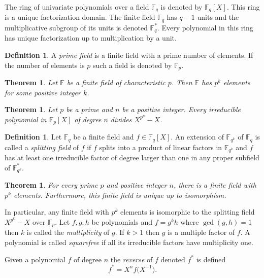 \documentclass{article}
\newcounter{dummy} \numberwithin{dummy}{section}
\theoremstyle{plain}
\newtheorem{thm}[dummy]{Theorem}
\theoremstyle{definition}
\newtheorem{mydef}[dummy]{Definition}
\def\Fp {{ \mathbb{F} _ {p} }}
\def\Fq {{ \mathbb{F} _ {q} }}
\def\FQ {{ \mathbb{F}^* _ {q} }}
\def\FqE {{ \mathbb{F} _ {q^k} }}
\def\FQE {{ \mathbb{F}^* _ {q^k} }}
\begin{document}
		The ring of univariate polynomials over a field $\Fq$ is denoted by $\Fq[X]$. This ring is a unique factorization domain. The finite field $\Fq$ has $q-1$ units and the multiplicative subgroup of its units is denoted $\FQ$. Every polynomial in this ring has unique factorization up to multiplication by a unit. 
		
    \begin{mydef}
		\label{DEF:pfield}
		    A \emph{prime field} is a finite field with a prime number of elements. If the number of elements is $p$ such a field is denoted by $\Fp$. 
		\end{mydef}
		
		\begin{thm}
		\label{THM:numElems}
		    Let $\mathbb{F}$ be a finite field of characteristic $p$. Then $\mathbb{F}$ has $p^k$ elements for some positive integer $k$. 
		\end{thm}
		
		\begin{thm}
		\label{THM:irreducs}
		    Let $p$ be a prime and $n$ be a positive integer. Every irreducible polynomial in $\Fp[X]$ of degree $n$ divides $X^{p^n}-X$.
		\end{thm}
		
		\begin{mydef}
		\label{DEF:splitting}
				Let $\Fq$ be a finite field and $f \in \Fq[X]$. An extension of $\FqE$ of $\Fq$ is called a \emph{splitting field} of $f$ if $f$ splits into a product of linear factors in $\FqE$ and $f$ has at least one irreducible factor of degree larger than one in any proper subfield of $\FQE$.  
		\end{mydef}
		
		\begin{thm}
		\label{THM:fuckingFields}
		    For every prime $p$ and positive integer $n$, there is a finite field with $p^k$ elements. Furthermore, this finite field is unique up to isomorphism.
		\end{thm}
		
		In particular, any finite field with $p^k$ elements is isomorphic to the splitting field $X^{p^k}-X$ over $\Fp$. 
		Let $f,g,h$ be polynomials and $f=g^k h$ where $\gcd(g,h)=1$ then $k$ is called the \emph{multiplicity} of $g$. If $k>1$ then $g$ is a multiple factor of $f$. A polynomial is called \emph{squarefree} if all its irreducible factors have multiplicity one.
		
		Given a polynomial $f$ of degree $n$ the \emph{reverse} of $f$ denoted $f^{*}$ is defined
		\[ f^{*} = X^n f \bigl(X^{-1} \bigr). \]
		
\end{document}
